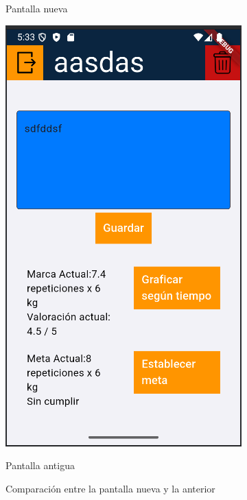 \begin{figure}[h!]
\begin{minipage}[b]{0.45\textwidth}
    \caption{Pantalla nueva}
    \label{fig:pantalla_nueva}
  \end{minipage}
  \hfill
  \begin{minipage}[b]{0.45\textwidth}
    \centering
    \includegraphics[width=\textwidth]{fotos/ejerciciosVieja.png}
    \caption{Pantalla antigua}
    \label{fig:pantalla_vieja}
  \end{minipage}
  \caption{Comparaci\'on entre la pantalla nueva y la anterior}
  \label{fig:comparacion_pantallas}
\end{figure}

